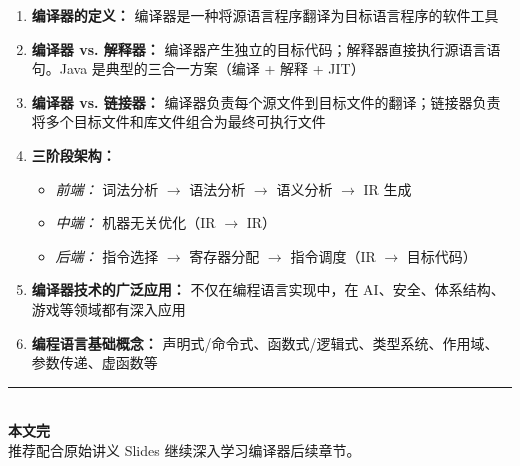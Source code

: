 \documentclass[12pt,a4paper]{ctexart}
\begin{document}
\begin{enumerate}[itemsep=0.3em]
  \item \textbf{编译器的定义：} 编译器是一种将源语言程序翻译为目标语言程序的软件工具
  \item \textbf{编译器 vs. 解释器：} 编译器产生独立的目标代码；解释器直接执行源语言语句。Java 是典型的三合一方案（编译 + 解释 + JIT）
  \item \textbf{编译器 vs. 链接器：} 编译器负责每个源文件到目标文件的翻译；链接器负责将多个目标文件和库文件组合为最终可执行文件
  \item \textbf{三阶段架构：}
  \begin{itemize}
    \item \emph{前端：} 词法分析 $\rightarrow$ 语法分析 $\rightarrow$ 语义分析 $\rightarrow$ IR 生成
    \item \emph{中端：} 机器无关优化（IR $\rightarrow$ IR）
    \item \emph{后端：} 指令选择 $\rightarrow$ 寄存器分配 $\rightarrow$ 指令调度（IR $\rightarrow$ 目标代码）
  \end{itemize}
  \item \textbf{编译器技术的广泛应用：} 不仅在编程语言实现中，在 AI、安全、体系结构、游戏等领域都有深入应用
  \item \textbf{编程语言基础概念：} 声明式/命令式、函数式/逻辑式、类型系统、作用域、参数传递、虚函数等
\end{enumerate}

\vfill
\begin{center}
\rule{0.5\textwidth}{0.3mm}\\[0.5em]
{\large\bfseries\color{mainblue} 本文完}\\[0.3em]
{\small 推荐配合原始讲义 Slides 继续深入学习编译器后续章节。}
\end{center}
\end{document}

